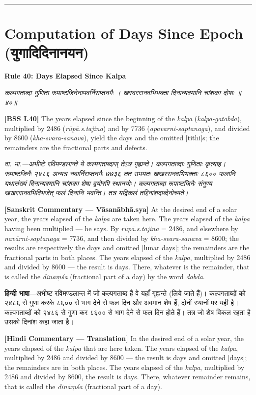 \documentclass[11pt,a4paper]{book}
\newcommand{\dev}[1]{{\devanagarifont #1}}
\newcommand{\shlokabilingual}[2]{%
  \par\vspace{0.8em}%
  \noindent\begin{minipage}[t]{0.48\textwidth}
    \RaggedRight
    \dev{\textit{#1}}
  \end{minipage}%
  \hfill
  \begin{minipage}[t]{0.48\textwidth}
    \RaggedRight
    #2%
  \end{minipage}%
  \par\vspace{0.8em}%
}
\newcommand{\sktcommbilingual}[2]{%
  \par\vspace{0.5em}%
  \noindent\begin{minipage}[t]{0.48\textwidth}
    \RaggedRight\small\itshape
    \dev{#1}
  \end{minipage}%
  \hfill
  \begin{minipage}[t]{0.48\textwidth}
    \RaggedRight\small
    #2%
  \end{minipage}%
  \par\vspace{0.5em}%
}
\newcommand{\hindicommbilingual}[2]{%
  \par\vspace{0.5em}%
  \noindent\begin{minipage}[t]{0.48\textwidth}
    \RaggedRight\small
    \dev{#1}
  \end{minipage}%
  \hfill
  \begin{minipage}[t]{0.48\textwidth}
    \RaggedRight\small
    #2%
  \end{minipage}%
  \par\vspace{0.5em}%
}
\newcommand{\ruleheadingbilingual}[2]{%
  \par\vspace{0.8em}%
  \noindent\begin{minipage}[t]{0.48\textwidth}
    \textbf{\color{sectioncolor}\dev{#1}}
  \end{minipage}%
  \hfill
  \begin{minipage}[t]{0.48\textwidth}
    \textbf{\color{sectioncolor}#2}
  \end{minipage}%
  \par\vspace{0.4em}%
}
\newcommand{\secdivider}{%
  \begin{center}\rule{0.4\textwidth}{0.5pt}\end{center}%
}
\begin{document}
\secdivider
\clearpage

\section{Computation of Days Since Epoch (\dev{युगादिदिनानयन})}

\ruleheadingbilingual{नियमः ४०}{Rule 40: Days Elapsed Since Kalpa}

\shlokabilingual{%
कल्पगताब्दा गुणिता रूपाष्टजिनेनापवर्निसप्तनगैः ।
खस्वरसनवभिभक्ता दिनान्यवमानि चांशका दोषाः ॥४०॥
}{%
\textbf{[BSS I.40]} The years elapsed since the beginning of the \textit{kalpa} (\textit{kalpa-gatābdā}), multiplied by 2486 (\textit{rūpā.s.tajina}) and by 7736 (\textit{apavarni-saptanaga}), and divided by 8600 (\textit{kha-svara-sanava}), yield the days and the omitted [tithi]s; the remainders are the fractional parts and defects.
}

\sktcommbilingual{%
\dev{वा. भा.}---अभीष्टे रविमण्डलान्ते ये कल्पगताब्दास्‌ तेऽत्र गृह्यन्ते। कल्पगताब्दाः गुणिताः कृत्याह। रूपाष्टजिनैः २४८६ अन्यत्र नवार्निसप्तनगैः ७७३६ तत उभयतः खखरसनवभिभक्ताः ८६०० फलानि यथासंख्यं दिनान्यवमानि चांशका शेषा द्वयोरपि स्थानयोः। कल्पगताब्दा रूपाष्टजिनैः संगुण्य खखरसनवभिविभजेत्‌ फलं दिनानि भवन्ति। तत्र यद्विकलं तद्दिनांशदाब्देनोच्यते।
}{%
\textbf{[Sanskrit Commentary --- Vāsanābhā.sya]} At the desired end of a solar year, the years elapsed of the \textit{kalpa} are taken here. The years elapsed of the \textit{kalpa} having been multiplied --- he says. By \textit{rūpā.s.tajina} = 2486, and elsewhere by \textit{navārni-saptanaga} = 7736, and then divided by \textit{kha-svara-sanava} = 8600; the results are respectively the days and omitted [lunar days]; the remainders are the fractional parts in both places. The years elapsed of the \textit{kalpa}, multiplied by 2486 and divided by 8600 --- the result is days. There, whatever is the remainder, that is called the \textit{dināṃśa} (fractional part of a day) by the word \textit{dābda}.
}

\hindicommbilingual{%
\textbf{हिन्दी भाषा}---अभीष्ट रविमण्डलान्त में जो कल्पगताब्द हैं वे यहाँ गृह्यन्ते (लिये जाते हैं)। कल्पगताब्दों को २४८६ से गुणा करके ८६०० से भाग देने से फल दिन और अवमान शेष हैं, दोनों स्थानों पर यही है। कल्पगताब्दों को २४८६ से गुणा कर ८६०० से भाग देने से फल दिन होते हैं। तत्र जो शेष विकल रहता है उसको दिनांश कहा जाता है।
}{%
\textbf{[Hindi Commentary --- Translation]} In the desired end of a solar year, the years elapsed of the \textit{kalpa} that are here taken. The years elapsed of the \textit{kalpa}, multiplied by 2486 and divided by 8600 --- the result is days and omitted [days]; the remainders are in both places. The years elapsed of the \textit{kalpa}, multiplied by 2486 and divided by 8600, the result is days. There, whatever remainder remains, that is called the \textit{dināṃśa} (fractional part of a day).
}
\end{document}

